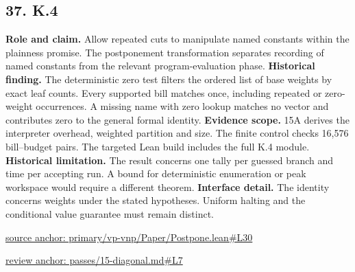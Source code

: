 \documentclass[11pt,letterpaper]{article}
\theoremstyle{definition}\newtheorem{definition}[theorem]{Definition}\newtheorem{example}[theorem]{Example}
\theoremstyle{remark}\newtheorem{remark}[theorem]{Remark}
\begin{document}
\subsection*{37. K.4}
\textbf{Role and claim.} Allow repeated cuts to manipulate named constants within the plainness promise. The postponement transformation separates recording of named constants from the relevant program-evaluation phase.
\textbf{Historical finding.} The deterministic zero test filters the ordered list of base weights by exact leaf counts. Every supported bill matches once, including repeated or zero-weight occurrences. A missing name with zero lookup matches no vector and contributes zero to the general formal identity.
\textbf{Evidence scope.} 15A derives the interpreter overhead, weighted partition and size. The finite control checks 16,576 bill–budget pairs. The targeted Lean build includes the full K.4 module.
\textbf{Historical limitation.} The result concerns one tally per guessed branch and time per accepting run. A bound for deterministic enumeration or peak workspace would require a different theorem.
\textbf{Interface detail.} The identity concerns weights under the stated hypotheses. Uniform halting and the conditional value guarantee must remain distinct.
\par\href{https://github.com/nousentllc/VP-VNP-Review/blob/8a7976933b6b2b4ffda1ad3a0dfb5fc6b6f023e8/primary/vp-vnp/Paper/Postpone.lean\#L30}{source anchor: primary/vp-vnp/Paper/Postpone.lean\#L30}
\par\href{https://github.com/nousentllc/VP-VNP-Review/blob/8a7976933b6b2b4ffda1ad3a0dfb5fc6b6f023e8/passes/15-diagonal.md\#L7}{review anchor: passes/15-diagonal.md\#L7}
\goodbreak
{}
\hypertarget{claim.38}{}
\end{document}

